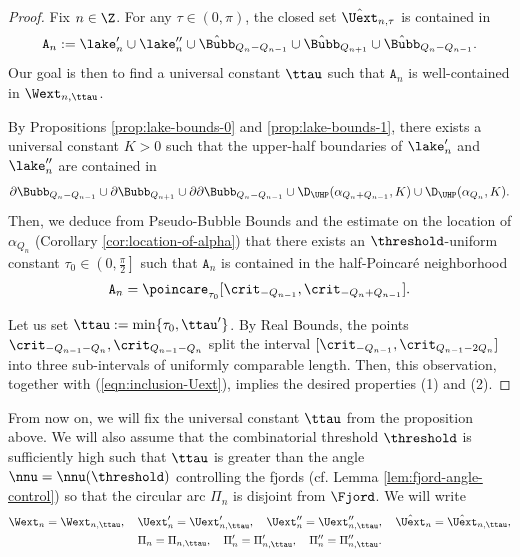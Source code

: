 \documentclass{amsart}
\begin{document}
\begin{proof}
    Fix $n \in \Z$.
    For any $\tau \in (0 ,\pi)$, the closed set $\hat{\Uext}_{n,\tau}$ is contained in 
    \[
        \mathtt{A}_n := \lake'_n \cup \lake''_n \cup \hat{\Bubb}_{Q_n-Q_{n-1}} \cup \hat{\Bubb}_{Q_{n+1}} \cup \hat{\Bubb}_{Q_n-Q_{n-1}}.
    \]
    Our goal is then to find a universal constant $\ttau$ such that $\mathtt{A}_n$ is well-contained in $\Wext_{n,\ttau}$.
    
    By Propositions \ref{prop:lake-bounds-0} and \ref{prop:lake-bounds-1}, there exists a universal constant $K>0$ such that the upper-half boundaries of $\lake'_n$ and $\lake''_n$ are contained in
    \[
        \partial \Bubb_{Q_n-Q_{n-1}} \cup \partial \Bubb_{Q_{n+1}} \cup \partial \partial \Bubb_{Q_n-Q_{n-1}} \cup \D_{\UHP}(\alpha_{Q_n+Q_{n-1}}, K) \cup \D_{\UHP}(\alpha_{Q_n}, K).
    \]
    Then, we deduce from Pseudo-Bubble Bounds and the estimate on the location of $\alpha_{Q_n}$ (Corollary \ref{cor:location-of-alpha}) that there exists an $\threshold$-uniform constant $\tau_0 \in \left( 0, \frac{\pi}{2} \right]$ such that $\mathtt{A}_n$ is contained in the half-Poincar\'e neighborhood 
    \begin{align*}
    \label{eqn:inclusion-Uext}
        \mathtt{A}_{n} = \poincare_{\tau_0}[\crit_{-Q_{n-1}},\crit_{-Q_n+Q_{n-1}}].
    \end{align*}

    Let us set $\ttau := \min \{ \tau_0 , \ttau'\}$.
    By Real Bounds, the points $\crit_{-Q_{n-1}-Q_n}, \crit_{Q_{n-1}-Q_n}$ split the interval $[\crit_{-Q_{n-1}}, \crit_{Q_{n-1}-2Q_n}]$ into three sub-intervals of uniformly comparable length.
    Then, this observation, together with (\ref{eqn:inclusion-Uext}), implies the desired properties (1) and (2).
\end{proof}

From now on, we will fix the universal constant $\ttau$ from the proposition above.
We will also assume that the combinatorial threshold $\threshold$ is sufficiently high such that $\ttau$ is greater than the angle $\nnu = \nnu(\threshold)$ controlling the fjords (cf. Lemma \ref{lem:fjord-angle-control}) so that the circular arc $\Pi_n$ is disjoint from $\Fjord$.
We will write
\begin{gather*}
    \Wext_n = \Wext_{n,\ttau}, \quad 
    \Uext'_n = \Uext'_{n,\ttau}, \quad \Uext''_n = \Uext''_{n,\ttau}, \quad \hat{\Uext}_n = \hat{\Uext}_{n,\ttau}, \\
    \Pi_n = \Pi_{n,\ttau}, \quad  \Pi'_n = \Pi'_{n,\ttau}, \quad \Pi''_n = \Pi''_{n,\ttau}.
\end{gather*}
\end{document}
